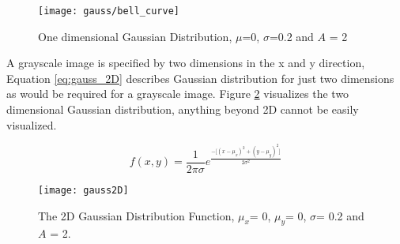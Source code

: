 \begin{figure}[H]
  \centering
  \centering\texttt{[image: gauss/bell\_curve]}
  \caption{One dimensional Gaussian Distribution, $\mu$=0, $\sigma$=0.2 and $A$ = 2}
  \label{fig:gauss}
\end{figure}

A grayscale image is specified by two dimensions in the x and y direction, Equation \ref{eq:gauss_2D} describes Gaussian distribution for just two dimensions as would be required for a grayscale image. Figure \ref{fig:gauss_2D} visualizes the two dimensional Gaussian distribution, anything beyond 2D cannot be easily visualized. 

\begin{equation}
f(x,y) = \frac{1}{2\pi\sigma}e^\frac{{-\big[(x-\mu_x)^2 + (y-\mu_y)^2\big]}}{2\sigma^2}
\label{eq:gauss_2D}
\end{equation}

\begin{figure}[H]
  \centering
  \centering\texttt{[image: gauss2D]}
  \caption{The 2D Gaussian Distribution Function, $\mu_x$= 0, $\mu_y$= 0, $\sigma$= 0.2 and $A$ = 2.}
  \label{fig:gauss_2D}
\end{figure}







  
  
